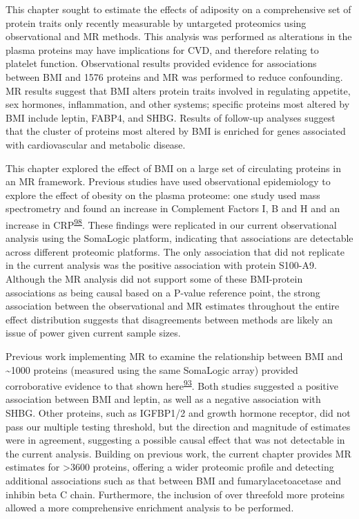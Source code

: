 \documentclass[11pt,twoside]{bristolthesis}
\begin{document}
This chapter sought to estimate the effects of adiposity on a comprehensive set of protein traits only recently measurable by untargeted proteomics using observational and MR methods. This analysis was performed as alterations in the plasma proteins may have implications for CVD, and therefore relating to platelet function. Observational results provided evidence for associations between BMI and 1576 proteins and MR was performed to reduce confounding. MR results suggest that BMI alters protein traits involved in regulating appetite, sex hormones, inflammation, and other systems; specific proteins most altered by BMI include leptin, FABP4, and SHBG. Results of follow-up analyses suggest that the cluster of proteins most altered by BMI is enriched for genes associated with cardiovascular and metabolic disease.

This chapter explored the effect of BMI on a large set of circulating proteins in an MR framework. Previous studies have used observational epidemiology to explore the effect of obesity on the plasma proteome: one study used mass spectrometry and found an increase in Complement Factors I, B and H and an increase in CRP\textsuperscript{\protect\hyperlink{ref-Cominetti2018}{98}}. These findings were replicated in our current observational analysis using the SomaLogic platform, indicating that associations are detectable across different proteomic platforms. The only association that did not replicate in the current analysis was the positive association with protein S100-A9. Although the MR analysis did not support some of these BMI-protein associations as being causal based on a P-value reference point, the strong association between the observational and MR estimates throughout the entire effect distribution suggests that disagreements between methods are likely an issue of power given current sample sizes.

Previous work implementing MR to examine the relationship between BMI and \textasciitilde1000 proteins (measured using the same SomaLogic array) provided corroborative evidence to that shown here\textsuperscript{\protect\hyperlink{ref-Zaghlool2021}{93}}. Both studies suggested a positive association between BMI and leptin, as well as a negative association with SHBG. Other proteins, such as IGFBP1/2 and growth hormone receptor, did not pass our multiple testing threshold, but the direction and magnitude of estimates were in agreement, suggesting a possible causal effect that was not detectable in the current analysis. Building on previous work, the current chapter provides MR estimates for \textgreater3600 proteins, offering a wider proteomic profile and detecting additional associations such as that between BMI and fumarylacetoacetase and inhibin beta C chain. Furthermore, the inclusion of over threefold more proteins allowed a more comprehensive enrichment analysis to be performed.
\end{document}
